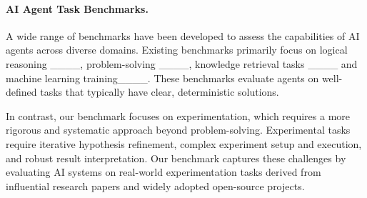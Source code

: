 

\paragraph{AI Agent Task Benchmarks.}

A wide range of benchmarks have been developed to assess the capabilities of AI agents across diverse domains. Existing benchmarks primarily focus on logical reasoning ____, problem-solving ____, knowledge retrieval tasks ____ and machine learning training____. These benchmarks evaluate agents on well-defined tasks that typically have clear, deterministic solutions.

In contrast, our benchmark focuses on experimentation, which requires a more rigorous and systematic approach beyond problem-solving. Experimental tasks require iterative hypothesis refinement, complex experiment setup and execution, and robust result interpretation.
Our benchmark captures these challenges by evaluating AI systems on real-world experimentation tasks derived from influential research papers and widely adopted open-source projects.




